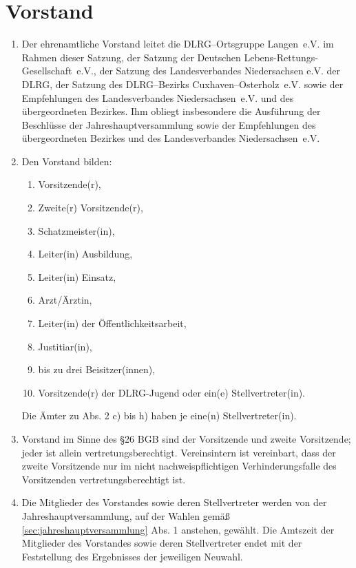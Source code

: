 \documentclass[%
12pt, %
a4paper, %
headsepline, %
parskip, %
headings=normal, %
]{scrreprt}
\begin{document}
\section{Vorstand}
\label{sec:vorstand}
\begin{enumerate}
    \item Der ehrenamtliche Vorstand leitet die DLRG--Ortsgruppe Langen~e.V. im Rahmen dieser Satzung, der Satzung der Deutschen Lebens-Rettungs-Gesellschaft~e.V., der Satzung des Landesverbandes Niedersachsen e.V. der DLRG, der Satzung des DLRG--Bezirks Cuxhaven--Osterholz~e.V. sowie der Empfehlungen des Landesverbandes Niedersachsen~e.V. und des übergeordneten Bezirkes. Ihm obliegt insbesondere die Ausführung der Beschlüsse der Jahreshauptversammlung sowie der Empfehlungen des übergeordneten Bezirkes und des Landesverbandes Niedersachsen~e.V.
    \item Den Vorstand bilden:\begin{enumerate}[noitemsep]
        \item Vorsitzende(r),
        \item Zweite(r) Vorsitzende(r),
        \item Schatzmeister(in),
        \item Leiter(in) Ausbildung,
        \item Leiter(in) Einsatz,
        \item Arzt/Ärztin,
        \item Leiter(in) der Öffentlichkeitsarbeit,
        \item Justitiar(in),
        \item bis zu drei Beisitzer(innen),
        \item Vorsitzende(r) der DLRG-Jugend oder ein(e) Stellvertreter(in).
    \end{enumerate}
    Die Ämter zu Abs. 2 c) bis h) haben je eine(n) Stellvertreter(in).
    \item Vorstand im Sinne des \S 26 BGB sind der Vorsitzende und zweite Vorsitzende; jeder ist allein vertretungsberechtigt. Vereinsintern ist vereinbart, dass der zweite Vorsitzende nur im nicht nachweispflichtigen Verhinderungsfalle des Vorsitzenden vertretungsberechtigt ist.
    \item Die Mitglieder des Vorstandes sowie deren Stellvertreter werden von der Jahreshauptversammlung, auf der Wahlen gemäß \ref{sec:jahreshauptversammlung} Abs. 1 anstehen, gewählt. Die Amtszeit der Mitglieder des Vorstandes sowie deren Stellvertreter endet mit der Feststellung des Ergebnisses der jeweiligen Neuwahl.

\end{enumerate}
\end{document}
